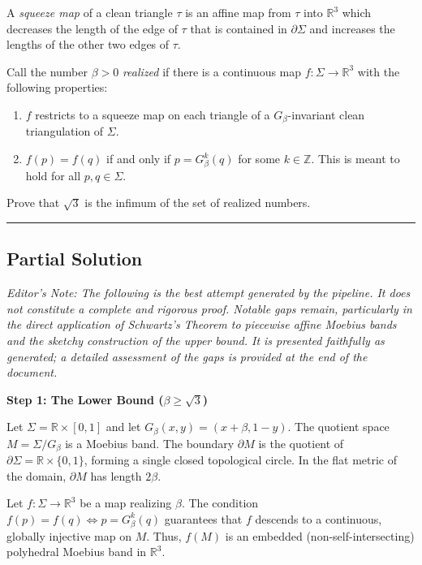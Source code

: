 \documentclass[12pt]{article}
\begin{document}
A \textit{squeeze map} of a clean triangle $\tau$ is an affine map from $\tau$ into $\mathbb{R}^3$ which decreases the length of the edge of $\tau$ that is contained in $\partial \Sigma$ and increases the lengths of the other two edges of $\tau$.

Call the number $\beta>0$ \textit{realized} if there is a continuous map $f: \Sigma \to \mathbb{R}^3$ with the following properties:
\begin{enumerate}
\item $f$ restricts to a squeeze map on each triangle of a $G_{\beta}$-invariant clean triangulation of $\Sigma$.
\item $f(p)=f(q)$ if and only if $p=G_{\beta}^k(q)$ for some $k \in \mathbb{Z}$. This is meant to hold for all $p,q \in \Sigma$.
\end{enumerate}
Prove that $\sqrt 3$ is the infimum of the set of realized numbers.

\vspace{1em}
\hrule
\vspace{1em}

\subsection*{Partial Solution}

\textit{Editor's Note: The following is the best attempt generated by the pipeline. It does not constitute a complete and rigorous proof. Notable gaps remain, particularly in the direct application of Schwartz's Theorem to piecewise affine Moebius bands and the sketchy construction of the upper bound. It is presented faithfully as generated; a detailed assessment of the gaps is provided at the end of the document.}

\vspace{1em}

\noindent\textbf{Step 1: The Lower Bound ($\beta \ge \sqrt{3}$)}

\vspace{0.5em}

Let $\Sigma = \mathbb{R} \times [0,1]$ and let $G_{\beta}(x,y) = (x+\beta, 1-y)$. The quotient space $M = \Sigma / G_{\beta}$ is a Moebius band. The boundary $\partial M$ is the quotient of $\partial \Sigma = \mathbb{R} \times \{0,1\}$, forming a single closed topological circle. In the flat metric of the domain, $\partial M$ has length $2\beta$.

Let $f: \Sigma \to \mathbb{R}^3$ be a map realizing $\beta$. The condition $f(p)=f(q) \iff p = G_{\beta}^k(q)$ guarantees that $f$ descends to a continuous, globally injective map on $M$. Thus, $f(M)$ is an embedded (non-self-intersecting) polyhedral Moebius band in $\mathbb{R}^3$. 
\end{document}
